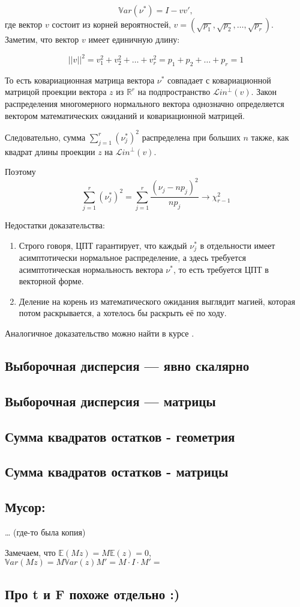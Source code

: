 \documentclass[11pt,russian,]{article}
\newcommand{\E}{\mathbb{E}}
\newcommand{\RR}{\mathbb{R}}
\newcommand{\1}{\mathbbm{1}}
\newcommand{\Lin}{\mathcal{L}in}
\newcommand{\Linp}{\Lin^{\perp}}
\newcommand{\Var}{\mathbb{V}ar}
\begin{document}
\[
\Var(\nu^*) = I - vv',
\] где вектор \(v\) состоит из корней вероятностей,
\(v= (\sqrt{p_1}, \sqrt{p_2}, \ldots, \sqrt{p_r})\). Заметим, что вектор
\(v\) имеет единичную длину:

\[
||v||^2 = v_1^2 + v_2^2 + \ldots + v_r^2 = p_1 + p_2 + \ldots + p_r = 1
\]

То есть ковариационная матрица вектора \(\nu^*\) совпадает с
ковариационной матрицой проекции вектора \(z\) из \(\RR^r\) на
подпространство \(\Linp(v)\). Закон распределения многомерного
нормального вектора однозначно определяется вектором математических
ожиданий и ковариационной матрицей.

Следовательно, сумма \(\sum_{j=1}^r (\nu_j^*)^2\) распределена при
больших \(n\) также, как квадрат длины проекции \(z\) на \(\Linp(v)\).

Поэтому \[
\sum_{j=1}^r (\nu_j^*)^2 = \sum_{j=1}^r \frac{(\nu_j - np_j)^2}{np_j} \to \chi^2_{r-1}
\]

Недостатки доказательства:

\begin{enumerate}
\def\labelenumi{\arabic{enumi}.}
\item
  Строго говоря, ЦПТ гарантирует, что каждый \(\nu_j^*\) в отдельности
  имеет асимптотически нормальное распределение, а здесь требуется
  асимптотическая нормальность вектора \(\nu^*\), то есть требуется ЦПТ
  в векторной форме.
\item
  Деление на корень из математического ожидания выглядит магией, которая
  потом раскрывается, а хотелось бы раскрыть её по ходу.
\end{enumerate}

Аналогичное доказательство можно найти в курсе
\textcite{panchenko2005statistics}.

\subsection{Выборочная дисперсия --- явно скалярно}\label{---}

\subsection{Выборочная дисперсия --- матрицы}\label{--}

\subsection{Сумма квадратов остатков - геометрия}\label{-----}

\subsection{Сумма квадратов остатков - матрицы}\label{-----}

\subsection{Мусор:}

\ldots{} (где-то была копия)

Замечаем, что \(\E(Mz) = M\E(z)=0\),
\(\Var(Mz)=M\Var(z)M'=M\cdot I \cdot M'=\)

\subsection{Про t и F похоже отдельно :)}\label{-t--f--}

\printbibliography
\end{document}
